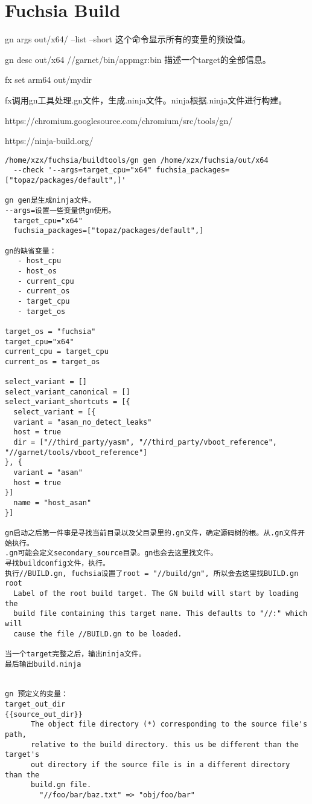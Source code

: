 \section{Fuchsia Build}
gn args out/x64/ --list --short
这个命令显示所有的变量的预设值。

gn desc out/x64 //garnet/bin/appmgr:bin
描述一个target的全部信息。


fx set arm64 out/mydir

fx调用gn工具处理.gn文件，生成.ninja文件。ninja根据.ninja文件进行构建。

https://chromium.googlesource.com/chromium/src/tools/gn/

https://ninja-build.org/

\begin{verbatim}
/home/xzx/fuchsia/buildtools/gn gen /home/xzx/fuchsia/out/x64 
  --check '--args=target_cpu="x64" fuchsia_packages=["topaz/packages/default",]'

gn gen是生成ninja文件。
--args=设置一些变量供gn使用。
  target_cpu="x64" 
  fuchsia_packages=["topaz/packages/default",]

gn的缺省变量：
   - host_cpu
   - host_os
   - current_cpu
   - current_os
   - target_cpu
   - target_os

target_os = "fuchsia"
target_cpu="x64"
current_cpu = target_cpu
current_os = target_os

select_variant = []
select_variant_canonical = []
select_variant_shortcuts = [{
  select_variant = [{
  variant = "asan_no_detect_leaks"
  host = true
  dir = ["//third_party/yasm", "//third_party/vboot_reference", "//garnet/tools/vboot_reference"]
}, {
  variant = "asan"
  host = true
}]
  name = "host_asan"
}]

gn启动之后第一件事是寻找当前目录以及父目录里的.gn文件，确定源码树的根。从.gn文件开始执行。
.gn可能会定义secondary_source目录。gn也会去这里找文件。
寻找buildconfig文件，执行。
执行//BUILD.gn, fuchsia设置了root = "//build/gn", 所以会去这里找BUILD.gn
root  
  Label of the root build target. The GN build will start by loading the
  build file containing this target name. This defaults to "//:" which will
  cause the file //BUILD.gn to be loaded.

当一个target完整之后，输出ninja文件。
最后输出build.ninja


gn 预定义的变量：
target_out_dir
{{source_out_dir}}
      The object file directory (*) corresponding to the source file's path,
      relative to the build directory. this us be different than the target's
      out directory if the source file is in a different directory than the
      build.gn file.
        "//foo/bar/baz.txt" => "obj/foo/bar"


\end{verbatim}
